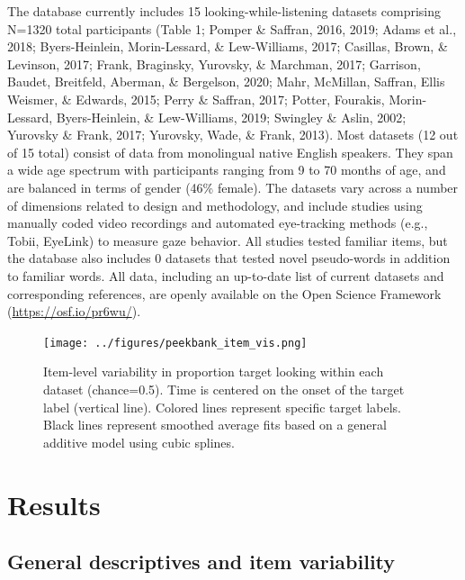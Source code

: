 \documentclass[10pt, letterpaper]{article}
\begin{document}
The database currently includes 15 looking-while-listening datasets
comprising N=1320 total participants (Table 1; Pomper \& Saffran, 2016,
2019; Adams et al., 2018; Byers-Heinlein, Morin-Lessard, \&
Lew-Williams, 2017; Casillas, Brown, \& Levinson, 2017; Frank,
Braginsky, Yurovsky, \& Marchman, 2017; Garrison, Baudet, Breitfeld,
Aberman, \& Bergelson, 2020; Mahr, McMillan, Saffran, Ellis Weismer, \&
Edwards, 2015; Perry \& Saffran, 2017; Potter, Fourakis, Morin-Lessard,
Byers-Heinlein, \& Lew-Williams, 2019; Swingley \& Aslin, 2002; Yurovsky
\& Frank, 2017; Yurovsky, Wade, \& Frank, 2013). Most datasets (12 out
of 15 total) consist of data from monolingual native English speakers.
They span a wide age spectrum with participants ranging from 9 to 70
months of age, and are balanced in terms of gender (46\% female). The
datasets vary across a number of dimensions related to design and
methodology, and include studies using manually coded video recordings
and automated eye-tracking methods (e.g., Tobii, EyeLink) to measure
gaze behavior. All studies tested familiar items, but the database also
includes 0 datasets that tested novel pseudo-words in addition to
familiar words. All data, including an up-to-date list of current
datasets and corresponding references, are openly available on the Open
Science Framework (\url{https://osf.io/pr6wu/}).

\begin{figure} 
\texttt{[image: ../figures/peekbank\_item\_vis.png]}
\caption{Item-level variability in proportion target looking within each dataset (chance=0.5). Time is centered on the onset of the target label (vertical line). Colored lines represent specific target labels. Black lines represent smoothed average fits based on a general additive model using cubic splines.}
\label{fig:peekbank_item_vis}
\end{figure}

\hypertarget{results}{%
\section{Results}\label{results}}

\hypertarget{general-descriptives-and-item-variability}{%
\subsection{General descriptives and item
variability}\label{general-descriptives-and-item-variability}}
\end{document}
